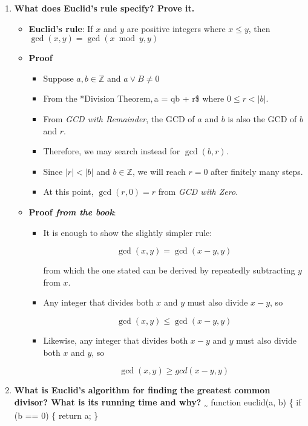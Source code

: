 \documentclass[a4paper,11pt]{article}
\begin{document}
\begin{enumerate}
\def\labelenumi{\arabic{enumi}.}
\item
  \textbf{What does Euclid's rule specify? Prove it.}

  \begin{itemize}
  \itemsep1pt\parskip0pt
  \item
    \textbf{Euclid's rule}: If $x$ and $y$ are positive integers where
    $x \le y$, then $\gcd(x, y) = \gcd(x \bmod y, y)$
  \item
    \textbf{Proof}

    \begin{itemize}
    \itemsep1pt\parskip0pt
    \item
      Suppose $a, b \in \mathbb{Z}$ and $a \lor B \neq 0$
    \item
      From the *Division Theorem$, $a = qb + r\$ where $0 \le r < |b|$.
    \item
      From \emph{GCD with Remainder}, the GCD of $a$ and $b$ is also the
      GCD of $b$ and $r$.
    \item
      Therefore, we may search instead for $\gcd(b, r)$.
    \item
      Since $|r| < |b|$ and $b \in \mathbb{Z}$, we will reach $r = 0$
      after finitely many steps.
    \item
      At this point, $\gcd(r, 0) = r$ from \emph{GCD with Zero}.
    \end{itemize}
  \item
    \textbf{Proof \emph{from the book}}:

    \begin{itemize}
    \item
      It is enough to show the slightly simpler rule:

      \[\gcd(x, y)= \gcd(x - y, y)\]

      from which the one stated can be derived by repeatedly subtracting
      $y$ from $x$.
    \item
      Any integer that divides both $x$ and $y$ must also divide
      $x - y$, so

      \[\gcd(x, y) \le \gcd(x - y, y)\]
    \item
      Likewise, any integer that divides both $x - y$ and $y$ must also
      divide both $x$ and $y$, so

      \[\gcd(x, y) \ge gcd(x - y, y)\]
    \end{itemize}
  \end{itemize}
\item
  \textbf{What is Euclid's algorithm for finding the greatest common
  divisor? What is its running time and why?}
  \textsubscript{\textasciitilde{}} function euclid(a, b) \{ if (b == 0)
  \{ return a; \}


\end{enumerate}
\end{document}
